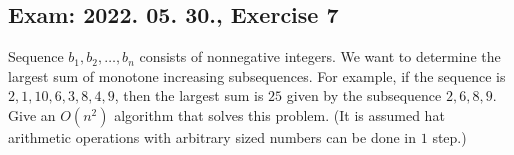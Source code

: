 \subsection{Exam: 2022. 05. 30., Exercise 7}

\label{exam_2022_05_30_exercise_7}


Sequence $b_1,b_2,\dots{},b_n$ consists of nonnegative integers. We want to
determine the largest sum of monotone increasing subsequences. For example, if
the sequence is $2,1,10,6,3,8,4,9$, then the largest sum is $25$ given by
the subsequence $2,6,8,9$. Give an $O(n^2)$ algorithm that solves this problem.
(It is assumed hat arithmetic operations with arbitrary sized numbers can be
done in $1$ step.)


